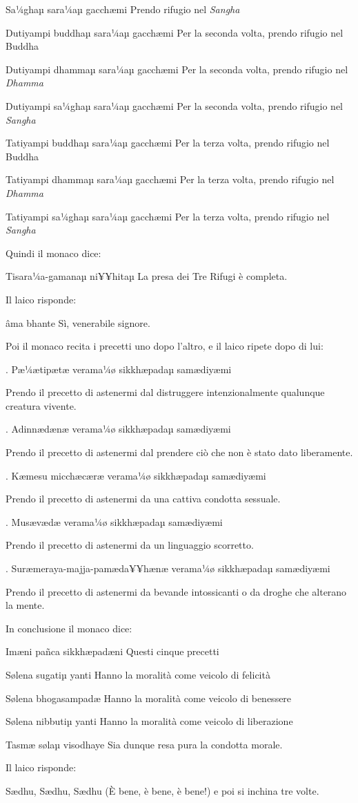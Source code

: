 Sa¼ghaµ sara¼aµ gacchæmi Prendo rifugio nel \textit{Sangha}

Dutiyampi buddhaµ sara¼aµ gacchæmi Per la seconda volta, prendo rifugio
nel Buddha

Dutiyampi dhammaµ sara¼aµ gacchæmi Per la seconda volta, prendo rifugio
nel \textit{Dhamma}

Dutiyampi sa¼ghaµ sara¼aµ gacchæmi Per la seconda volta, prendo rifugio
nel \textit{Sangha}

Tatiyampi buddhaµ sara¼aµ gacchæmi Per la terza volta, prendo rifugio
nel Buddha

Tatiyampi dhammaµ sara¼aµ gacchæmi Per la terza volta, prendo rifugio
nel \textit{Dhamma}

Tatiyampi sa¼ghaµ sara¼aµ gacchæmi Per la terza volta, prendo rifugio
nel \textit{Sangha}

Quindi il monaco dice:

Tisara¼a-gamanaµ ni¥¥hitaµ La presa dei Tre Rifugi è completa.

Il laico risponde:

âma bhante Sì, venerabile signore.

Poi il monaco recita i precetti uno dopo l'altro, e il laico ripete dopo
di lui:

\1. Pæ¼ætipætæ verama¼ø sikkhæpadaµ samædiyæmi

Prendo il precetto di astenermi dal distruggere intenzionalmente
qualunque creatura vivente.

\2. Adinnædænæ verama¼ø sikkhæpadaµ samædiyæmi

Prendo il precetto di astenermi dal prendere ciò che non è stato dato
liberamente.

\3. Kæmesu micchæcæræ verama¼ø sikkhæpadaµ samædiyæmi

Prendo il precetto di astenermi da una cattiva condotta sessuale.

\4. Musævædæ verama¼ø sikkhæpadaµ samædiyæmi

Prendo il precetto di astenermi da un linguaggio scorretto.

\5. Suræmeraya-majja-pamæda¥¥hænæ verama¼ø sikkhæpadaµ samædiyæmi

Prendo il precetto di astenermi da bevande intossicanti o da droghe che
alterano la mente.

In conclusione il monaco dice:

Imæni pañca sikkhæpadæni Questi cinque precetti

Sølena sugatiµ yanti Hanno la moralità come veicolo di felicità

Sølena bhogasampadæ Hanno la moralità come veicolo di benessere

Sølena nibbutiµ yanti Hanno la moralità come veicolo di liberazione

Tasmæ sølaµ visodhaye Sia dunque resa pura la condotta morale.

Il laico risponde:

Sædhu, Sædhu, Sædhu (È bene, è bene, è bene!) e poi si inchina tre
volte.
